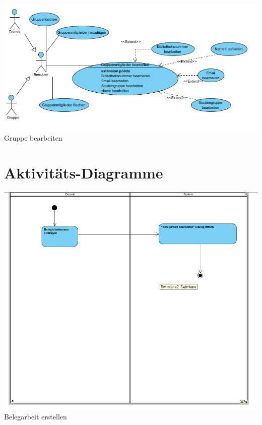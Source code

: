 \documentclass{article}
\begin{document}
\includegraphics[scale=1]{bilder/Gruppe_bearbeiten_UseCase.png}
Gruppe bearbeiten

\section{Aktivitäts-Diagramme}

\includegraphics[scale=0.8]{bilder/Belegarbeit_erstellen_Activity.png}
Belegarbeit erstellen
\end{document}
